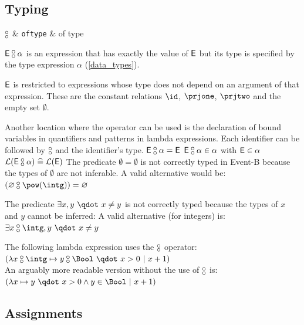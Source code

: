 \begin{samepage}
\subsection{Typing}
\label{typing}

\begin{rrnames}
  $\boftype$      & \texttt{oftype}   & of type
\end{rrnames}
\begin{rodinrefentry}
  \rrdesc
    $\expre\boftype \alpha$ is an expression that has exactly the value of $\textsf{E}$ but its
    type is specified by the type expression $\alpha$ (\ref{data_types}).

    $\mathsf{\textsf{E}}$ is restricted to expressions whose type does not depend on an argument of that expression.
    These are the constant relations $\id$, $\prjone$, $\prjtwo$ and the empty set $\emptyset$.

    Another location where the operator can be used is the declaration of bound variables 
    in quantifiers and patterns in lambda expressions.
    Each identifier can be followed by $\boftype$ and the identifier's type.
  \rrdef
    $\expre\boftype\alpha = \expre$
  \rrtypes
    $\expre\boftype\alpha\in\alpha$ with $\textsf{E}\in\alpha$
  \rrwd
    $\wdl(\expre\boftype\alpha) \defi \wdl(\expre)$
  \rrex
    The predicate $\emptyset=\emptyset$ is not correctly typed in Event-B because the types
    of $\emptyset$ are not inferable. A valid alternative would be:\\
    $(\emptyset\boftype\pow(\intg)) = \emptyset$

    The predicate $\exists x,y ~\qdot~ x\neq y$ is not correctly typed because the types of $x$ and $y$
    cannot be inferred: A valid alternative (for integers) is:\\
    $\exists x\boftype\intg,y ~\qdot~ x\neq y$

    The following lambda expression uses the $\boftype$ operator:\\
    $(\lambda x\boftype \intg\mapsto y\boftype\Bool ~\qdot~ x>0 ~|~ x+1)$\\
    An arguably more readable version without the use of $\boftype$ is:\\
    $(\lambda x\mapsto y ~\qdot~ x>0 \land y\in\Bool ~|~ x+1)$
\end{rodinrefentry}
\end{samepage}


\subsection{Assignments}
\label{assignments}

